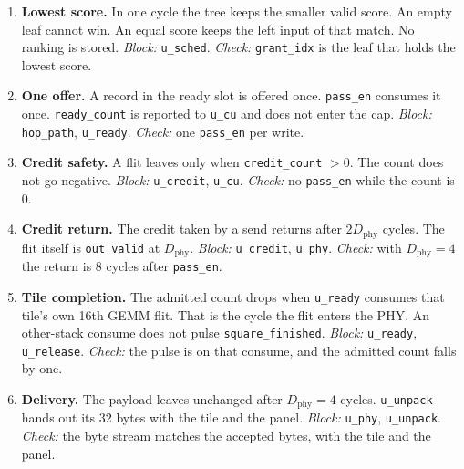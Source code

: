 \documentclass[11pt,a4paper]{article}
\begin{document}
\begin{enumerate}[leftmargin=*, label=\textbf{R\arabic*.}]
\begin{itemize}[leftmargin=1.2em]
    \item EDF. 88, then sequence 0.
    \item Shortest remaining. 16, then sequence 0.
    \item Most consumers. Panel 0, inverted consumers 254, then 16, then sequence 0.
    \item Longest remaining. Inverted \texttt{flits\_left} 15, then sequence 0.
  \end{itemize}
  \emph{Block:} \texttt{u\_score}.
  \emph{Check:} the packed word of the build matches that fill.
  \item \textbf{Lowest score.}
  In one cycle the tree keeps the smaller valid score.
  An empty leaf cannot win.
  An equal score keeps the left input of that match.
  No ranking is stored.
  \emph{Block:} \texttt{u\_sched}.
  \emph{Check:} \texttt{grant\_idx} is the leaf that holds the lowest score.
  \item \textbf{One offer.}
  A record in the ready slot is offered once.
  \texttt{pass\_en} consumes it once.
  \texttt{ready\_count} is reported to \texttt{u\_cu} and does not enter the cap.
  \emph{Block:} \texttt{hop\_path}, \texttt{u\_ready}.
  \emph{Check:} one \texttt{pass\_en} per write.
  \item \textbf{Credit safety.}
  A flit leaves only when \texttt{credit\_count} $> 0$.
  The count does not go negative.
  \emph{Block:} \texttt{u\_credit}, \texttt{u\_cu}.
  \emph{Check:} no \texttt{pass\_en} while the count is 0.
  \item \textbf{Credit return.}
  The credit taken by a send returns after $2 D_{\mathrm{phy}}$ cycles.
  The flit itself is \texttt{out\_valid} at $D_{\mathrm{phy}}$.
  \emph{Block:} \texttt{u\_credit}, \texttt{u\_phy}.
  \emph{Check:} with $D_{\mathrm{phy}} = 4$ the return is 8 cycles after \texttt{pass\_en}.
  \item \textbf{Tile completion.}
  The admitted count drops when \texttt{u\_ready} consumes that tile's own 16th GEMM flit.
  That is the cycle the flit enters the PHY.
  An other-stack consume does not pulse \texttt{square\_finished}.
  \emph{Block:} \texttt{u\_ready}, \texttt{u\_release}.
  \emph{Check:} the pulse is on that consume, and the admitted count falls by one.
  \item \textbf{Delivery.}
  The payload leaves unchanged after $D_{\mathrm{phy}} = 4$ cycles.
  \texttt{u\_unpack} hands out its 32 bytes with the tile and the panel.
  \emph{Block:} \texttt{u\_phy}, \texttt{u\_unpack}.
  \emph{Check:} the byte stream matches the accepted bytes, with the tile and the panel.
\end{enumerate}
\end{document}
